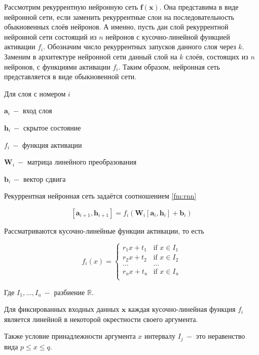 \documentclass[a4paper, 12pt]{article}
\begin{document}
Рассмотрим рекуррентную нейронную сеть $\mathbf{f}(\mathbf{x})$. Она представима в виде нейронной сети, если заменить рекуррентные слои на последовательность обыкновенных слоёв нейронов. А именно, пусть дан слой рекуррентной нейронной сети состоящий из $n$ нейронов с кусочно-линейной функцией активации $f_i$. Обозначим число рекуррентных запусков данного слоя через $k$. Заменим в архитектуре нейронной сети данный слой на $k$ слоёв, состоящих из $n$ нейронов, с функциями активации $f_i$. Таким образом, нейронная сеть представляется в виде обыкновенной сети.

Для слоя с номером $i$

$\mathbf{a}_i~-$ вход слоя

$\mathbf{h}_i~-$ скрытое состояние

$f_i~-$ функция активации

$\mathbf{W}_i~-$ матрица линейного преобразования

$\mathbf{b}_i~-$ вектор сдвига

Рекуррентная нейронная сеть задаётся соотношением \eqref{fm:rnn}

\begin{equation}\label{fm:rnn}
[\mathbf{a}_{i+1}, \mathbf{h}_{i+1}]=f_i\left(\mathbf{W}_i [\mathbf{a}_{i},\mathbf{h}_i] + \mathbf{b}_i\right)
\end{equation}

Рассматриваются кусочно-линейные функции активации, то есть

\[f_i(x)=\left\{
\begin{array}{ll}
      r_1 x+t_1 & \text{if } x\in I_1 \\
      r_2 x+t_2 & \text{if } x\in I_2 \\
      \dots&\dots\\
      r_u x+t_u & \text{if } x\in I_u \\
\end{array} 
\right. \]

Где $I_1,\dots,I_u~-$ разбиение $\mathbb{R}$.

Для фиксированных входных данных $\mathbf{x}$ каждая кусочно-линейная функция $f_i$ является линейной в некоторой окрестности своего аргумента.

Также условие принадлежности аргумента $x$ интервалу $I_j~-$ это неравенство вида $p \leq x \leq q$.
\end{document}
